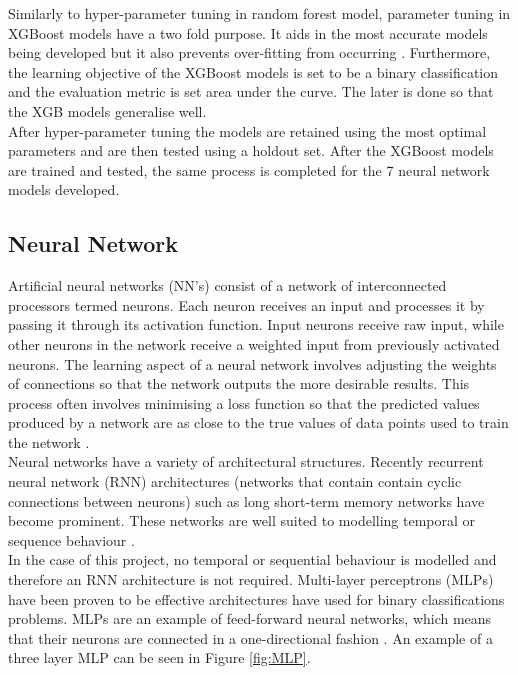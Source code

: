 Similarly to hyper-parameter tuning in random forest model, parameter tuning in XGBoost models have a two fold purpose. It aids in the most accurate models being developed but it also prevents over-fitting from occurring \parencite{xgb_tuning}. Furthermore, the learning objective of the XGBoost models is set to be a binary classification and the evaluation metric is set area under the curve. The later is done so that the XGB models generalise well. \\

After hyper-parameter tuning the models are retained using the most optimal parameters and are then tested using a holdout set. After the XGBoost models are trained and tested, the same process is completed for the 7 neural network models developed.  


\subsection{Neural Network}

Artificial neural networks (NN's) consist of a network of interconnected processors termed neurons. Each neuron receives an input and processes it by passing it through its activation function. Input neurons receive raw input, while other neurons in the network receive a weighted input from previously activated neurons. The learning aspect of a neural network involves adjusting the weights of connections so that the network outputs the more desirable results. This process often involves minimising a loss function so that the predicted values produced by a network are as close to the true values of data points used to train the network \parencite{NNOverview}. \\ 

Neural networks have a variety of architectural structures. Recently recurrent neural network (RNN) architectures (networks that contain contain cyclic connections between neurons) such as long short-term memory networks have become prominent. These networks are well suited to modelling temporal or sequence behaviour \parencite{LSTM}. \\

In the case of this project, no temporal or sequential behaviour is modelled and therefore an RNN architecture is not required. Multi-layer perceptrons (MLPs) have been proven to be effective architectures have used for binary classifications problems. MLPs are an example of feed-forward neural networks, which means that their neurons are connected in a one-directional fashion \parencite{MLP}. An example of a three layer MLP can be seen in Figure \ref{fig:MLP}.

